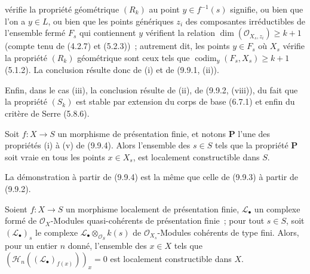 
vérifie la propriété géométrique $(R_k)$ au point $y\in f^{-1}(s)$ signifie, ou
bien que l'on a $y\in L$, ou bien que les points génériques $z_i$ des
composantes irréductibles de l'ensemble fermé $F_s$ qui contiennent $y$
vérifient la relation $\dim(\mathcal O_{X_s,z_i})\geq k+1$ (compte tenu de
(4.2.7) et (5.2.3))~; autrement dit, les points $y\in F_s$ où $X_s$ vérifie la
propriété $(R_k)$ géométrique sont ceux tels que
$\operatorname{codim}_y(F_s,X_s)\geq k+1$ (5.1.2). La conclusion résulte donc
de (i) et de (9.9.1, (ii)).

Enfin, dans le cas (iii), la conclusion résulte de (ii), de (9.9.2, (viii)), du
fait que la propriété $(S_k)$ est stable par extension du corps de base (6.7.1)
et enfin du critère de Serre (5.8.6).

\begin{corollary}[9.9.5]
\label{IV.9.9.5-fr}
Soit $f:X\to S$ un morphisme de présentation finie, et notons $\mathbf P$
l'une des propriétés (i) à (v) de (9.9.4). Alors l'ensemble des $s\in S$ tels
que la propriété $\mathbf P$ soit vraie en tous les points $x\in X_s$, est
localement constructible dans $S$.
\end{corollary}

La démonstration à partir de (9.9.4) est la même que celle de (9.9.3) à partir
de (9.9.2).

\begin{proposition}[9.9.6]
\label{IV.9.9.6-fr}
Soient $f:X\to S$ un morphisme localement de présentation finie,
$\mathcal L_\bullet$ un complexe formé de $\mathcal O_X$-Modules
quasi-cohérents de présentation finie~; pour tout $s\in S$, soit
$(\mathcal L_\bullet)_s$ le complexe
$\mathcal L_\bullet\otimes_{\mathcal O_S}k(s)$ de
$\mathcal O_{X_s}$-Modules cohérents de type fini. Alors, pour un entier $n$
donné, l'ensemble des $x\in X$ tels que
$(\mathcal H_n((\mathcal L_\bullet)_{f(x)}))_x=0$ est localement constructible
dans $X$.
\end{proposition}

